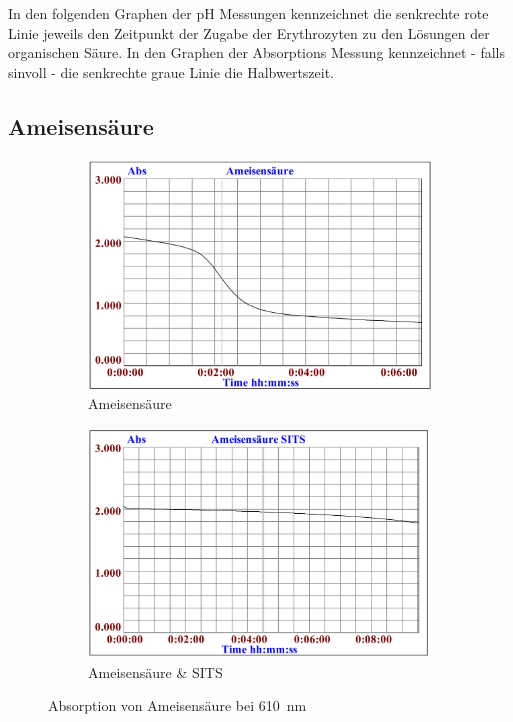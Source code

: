 \documentclass[a4paper,german]{scrreprt}
\begin{document}
In den folgenden Graphen der pH Messungen kennzeichnet die senkrechte rote
Linie jeweils den Zeitpunkt der Zugabe der Erythrozyten zu den Lösungen der
organischen Säure. In den Graphen der Absorptions Messung kennzeichnet - falls
sinvoll - die senkrechte graue Linie die Halbwertszeit.

\subsection{Ameisensäure}

\begin{figure}
	\centering
	\begin{subfigure}{.5\textwidth}
		\centering
		\includegraphics[width=\linewidth]{img/haem_ameisen.png}
		\caption{Ameisensäure}
	\end{subfigure}%
	\begin{subfigure}{.5\textwidth}
		\centering
		\includegraphics[width=\linewidth]{img/haem_ameisen_sits.png}
		\caption{Ameisensäure \& SITS}
	\end{subfigure}
	\caption{Absorption von Ameisensäure bei \SI{610}{nm}}
	\label{fig:haem_ameisen}
\end{figure}
\end{document}
